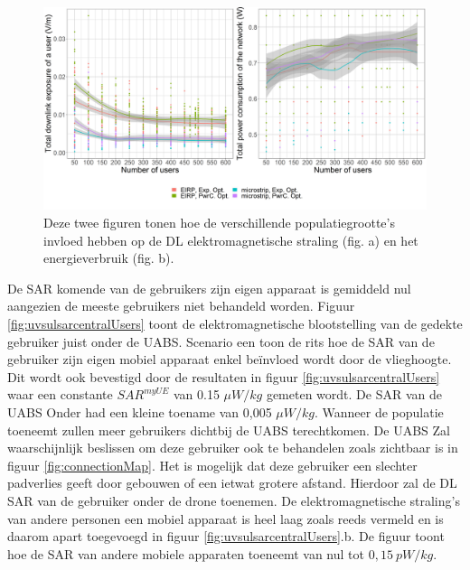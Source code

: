 \documentclass[twocolumn]{phdsymp_dutch}
\begin{document}
\begin{figure}[h!]
  \includegraphics[width=\linewidth]{../results/s2/uvsdlAndPc.png}
  \caption{Deze twee figuren tonen hoe de verschillende populatiegrootte's invloed hebben op de \acs{DL} elektromagnetische straling (fig. a) en het energieverbruik (fig. b).}
  \label{fig:s2b_dlAndPc}
\end{figure}

De \gls{SAR} komende van de gebruikers zijn eigen apparaat is gemiddeld nul aangezien de meeste gebruikers niet behandeld worden.
Figuur \ref{fig:uvsulsarcentralUsers} toont de elektromagnetische blootstelling van de gedekte gebruiker juist onder de \gls{UABS}.
Scenario een toon de rits hoe de \gls{SAR} van de gebruiker zijn eigen mobiel apparaat enkel be\"invloed wordt door de vlieghoogte.
Dit wordt ook bevestigd door de resultaten in figuur  \ref{fig:uvsulsarcentralUsers} waar een constante 
$SAR^{myUE}$ van 0.15 $\mu W/kg$ gemeten wordt.
De \gls{SAR} van de  \gls{UABS} Onder had een kleine toename van 0,005  $\mu W/kg$.
Wanneer de populatie toeneemt zullen meer gebruikers dichtbij de \gls{UABS} terechtkomen.
De \gls{UABS} Zal waarschijnlijk beslissen om deze gebruiker ook te behandelen zoals zichtbaar is in figuur \ref{fig:connectionMap}.
Het is mogelijk dat deze gebruiker een slechter padverlies geeft door gebouwen of een ietwat grotere afstand. Hierdoor zal de
\gls{DL} \gls{SAR} van de gebruiker onder de drone toenemen.
De elektromagnetische straling's van andere personen een mobiel apparaat is heel laag zoals 
reeds vermeld en is daarom apart toegevoegd in figuur  \ref{fig:uvsulsarcentralUsers}.b.
De figuur toont hoe de \gls{SAR} van andere mobiele apparaten toeneemt van nul tot $0,15\ pW/kg$.
\end{document}

